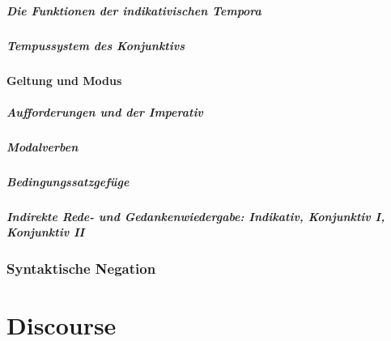 \documentclass{report}
\begin{document}
			\subsubsection{Die Funktionen der indikativischen Tempora}
			\subsubsection{Tempussystem des Konjunktivs}
		\subsection{Geltung und Modus}
			\subsubsection{Aufforderungen und der Imperativ}
			\subsubsection{Modalverben}
			\subsubsection{Bedingungssatzgefüge}
			\subsubsection{Indirekte Rede- und Gedankenwiedergabe: Indikativ, Konjunktiv I, Konjunktiv II}
	\section{Syntaktische Negation}

%
%
%
%
%
%
%
%
%
%
%

\part{Discourse}












%
%
%
%
%
%
%
%
%
%
%
%


 

\end{document}
